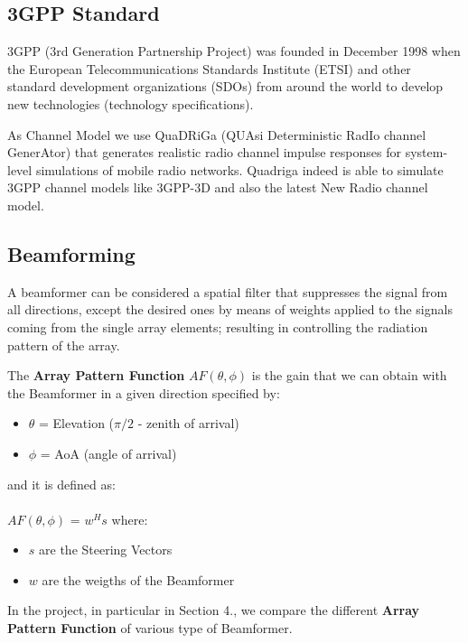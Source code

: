 \subsection{3GPP Standard}

3GPP (3rd Generation Partnership Project) was founded in December 1998 when the European 
Telecommunications Standards Institute (ETSI) 
and other standard development organizations (SDOs) 
from around the world to develop new technologies (technology specifications).

As Channel Model we use QuaDRiGa (QUAsi Deterministic RadIo channel GenerAtor) that 
generates realistic radio channel impulse responses for system-level simulations of mobile radio networks. 
Quadriga indeed is able to simulate 3GPP channel models like 3GPP-3D and also the latest New Radio channel model.


\subsection{Beamforming}

A beamformer can be considered a spatial filter that suppresses
the signal from all directions, except the desired ones by means 
of weights applied to the signals coming from the single array elements;
resulting in controlling the radiation pattern of the array.

The \textbf{Array Pattern Function} $AF(\theta,\phi)$ is the gain that we can obtain with the 
Beamformer in a given direction specified by:

\begin{itemize}
    \item $\theta$ = Elevation ($\pi/2$ - zenith of arrival)
    \item $\phi$ = AoA (angle of arrival)
\end{itemize}

and it is defined as: \\\\
$AF(\theta,\phi)$ = $w^Hs$ where:
\begin{itemize}
    \item $s$ are the Steering Vectors
    \item $w$ are the weigths of the Beamformer
\end{itemize}

In the project, in particular in Section 4., we compare the different \textbf{Array Pattern Function} 
of various type of Beamformer.